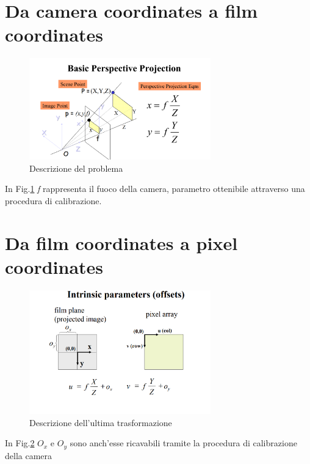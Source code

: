 \section{Da camera coordinates a film coordinates}
\begin{figure}[H]
	\centering
	\includegraphics[width=0.7\textwidth]{Immagini/perspective_projection.png}
	\caption{Descrizione del problema}
	\label{fig:perspective_projection}
\end{figure}
In Fig.\ref{fig:perspective_projection} \textit{f} rappresenta il fuoco della camera, parametro ottenibile attraverso una procedura di calibrazione.

\section{Da film coordinates a pixel coordinates}

\begin{figure}[H]
	\centering
	\includegraphics[width=0.7\textwidth]{Immagini/intrinsic_parameters.png}
	\caption{Descrizione dell'ultima trasformazione}
	\label{fig:intrinsic_parameters}
\end{figure}
In Fig.\ref{fig:intrinsic_parameters} $ O_{x}$ e $ O_{y} $ sono anch'esse ricavabili tramite la procedura di calibrazione della camera


